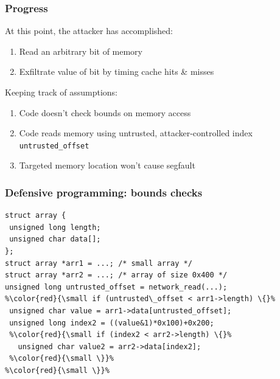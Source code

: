 \documentclass[10pt]{beamer}
\begin{document}
\begin{frame}

\frametitle{Progress}

At this point, the attacker has accomplished:
\begin{enumerate}
  \item Read an arbitrary bit of memory
  \item Exfiltrate value of bit by timing cache hits \& misses \\[1em]
\end{enumerate}\pause

Keeping track of assumptions:\pause
\begin{enumerate}
  \item Code doesn't check bounds on memory access
  \item Code reads memory using untrusted, attacker-controlled index \texttt{untrusted\_offset}
  \item Targeted memory location won't cause segfault
\end{enumerate}

\end{frame}


\begin{frame}[fragile]

\frametitle{Defensive programming: bounds checks}

\begin{lstlisting}[basicstyle=\small,style=customjava]
struct array {
 unsigned long length;
 unsigned char data[];
};
struct array *arr1 = ...; /* small array */
struct array *arr2 = ...; /* array of size 0x400 */
unsigned long untrusted_offset = network_read(...);
%\color{red}{\small if (untrusted\_offset < arr1->length) \{}%
 unsigned char value = arr1->data[untrusted_offset];
 unsigned long index2 = ((value&1)*0x100)+0x200;
 %\color{red}{\small if (index2 < arr2->length) \{}%
   unsigned char value2 = arr2->data[index2];
 %\color{red}{\small \}}%
%\color{red}{\small \}}%
\end{lstlisting}

\end{frame}

\end{document}
